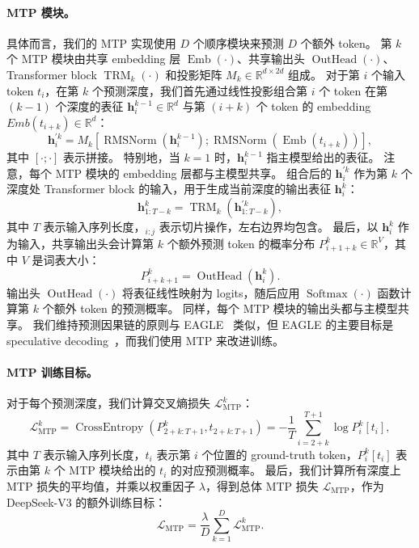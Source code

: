 \documentclass[11pt, a4paper, logo, copyright, nonumbering]{deepseek}
\newcommand{\dsviii}{DeepSeek-V3}
\begin{document}
\paragraph{MTP 模块。}
具体而言，我们的 MTP 实现使用 $D$ 个顺序模块来预测 $D$ 个额外 token。
第 $k$ 个 MTP 模块由共享 embedding 层 $\operatorname{Emb}(\cdot)$、共享输出头 $\operatorname{OutHead}(\cdot)$、Transformer block $\operatorname{TRM}_k(\cdot)$ 和投影矩阵 $M_k \in \mathbb{R}^{d \times 2d}$ 组成。
对于第 $i$ 个输入 token $t_i$，在第 $k$ 个预测深度，我们首先通过线性投影组合第 $i$ 个 token 在第 $(k-1)$ 个深度的表征 $\mathbf{h}_i^{k-1} \in \mathbb{R}^{d}$ 与第 $(i+k)$ 个 token 的 embedding $Emb(t_{i+k}) \in \mathbb{R}^{d}$：
\begin{equation}
    \mathbf{h}_i^{\prime k} = M_k [\operatorname{RMSNorm}(\mathbf{h}_i^{k-1}) ; \operatorname{RMSNorm}(\operatorname{Emb}(t_{i+k}))],
\end{equation}
其中 $[\cdot ; \cdot]$ 表示拼接。
特别地，当 $k=1$ 时，$\mathbf{h}_i^{k-1}$ 指主模型给出的表征。
注意，每个 MTP 模块的 embedding 层都与主模型共享。
组合后的 $\mathbf{h}_i^{\prime k}$ 作为第 $k$ 个深度处 Transformer block 的输入，用于生成当前深度的输出表征 $\mathbf{h}_{i}^{k}$：
\begin{equation}
    \mathbf{h}_{1:T-k}^{k} = \operatorname{TRM}_k(\mathbf{h}_{1:T-k}^{\prime k}),
\end{equation}
其中 $T$ 表示输入序列长度，$_{i:j}$ 表示切片操作，左右边界均包含。
最后，以 $\mathbf{h}_{i}^{k}$ 作为输入，共享输出头会计算第 $k$ 个额外预测 token 的概率分布 $P_{i+1+k}^{k} \in \mathbb{R}^{V}$，其中 $V$ 是词表大小：
\begin{equation}
    P_{i+k+1}^{k} = \operatorname{OutHead}(\mathbf{h}_{i}^{k}).
\end{equation}
输出头 $\operatorname{OutHead}(\cdot)$ 将表征线性映射为 logits，随后应用 $\operatorname{Softmax}(\cdot)$ 函数计算第 $k$ 个额外 token 的预测概率。
同样，每个 MTP 模块的输出头都与主模型共享。
我们维持预测因果链的原则与 EAGLE~\citep{eagle} 类似，但 EAGLE 的主要目标是 speculative decoding~\citep{speculative_xhm,speculative_google}，而我们使用 MTP 来改进训练。

\paragraph{MTP 训练目标。}
对于每个预测深度，我们计算交叉熵损失 $\mathcal{L}_{\text{MTP}}^{k}$：
\begin{equation}
    \mathcal{L}_{\text{MTP}}^{k} = \operatorname{CrossEntropy}(P_{2 + k:T + 1}^{k}, t_{2 + k:T + 1}) = -\frac{1}{T} \sum_{i=2 + k}^{T + 1} \log P_i^k [t_i],
\end{equation}
其中 $T$ 表示输入序列长度，$t_i$ 表示第 $i$ 个位置的 ground-truth token，$P_i^k [t_i]$ 表示由第 $k$ 个 MTP 模块给出的 $t_i$ 的对应预测概率。
最后，我们计算所有深度上 MTP 损失的平均值，并乘以权重因子 $\lambda$，得到总体 MTP 损失 $\mathcal{L}_{\text{MTP}}$，作为 \dsviii{} 的额外训练目标：
\begin{equation}
    \mathcal{L}_{\text{MTP}} = \frac{\lambda}{D} \sum_{k=1}^{D} \mathcal{L}_{\text{MTP}}^{k}.
\end{equation}
\end{document}
